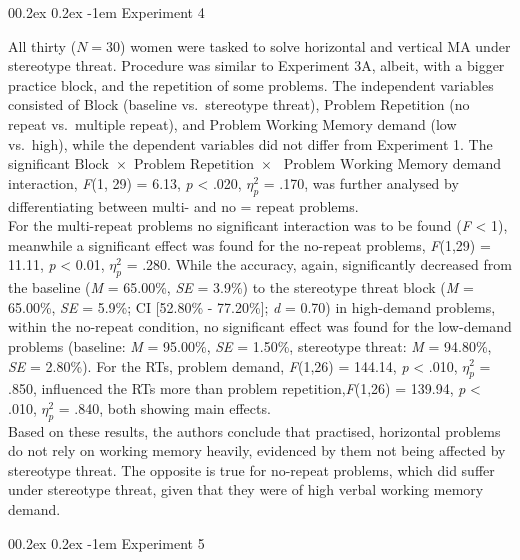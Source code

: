 \documentclass[
  stu,floatsintext]{apa7}
\makeatletter
\let\oldparagraph\paragraph
\renewcommand{\paragraph}[1]{\oldparagraph{#1}\mbox{}}
\renewcommand{\paragraph}{\@startsection{paragraph}{4}{\parindent}%
  {0\baselineskip \@plus 0.2ex \@minus 0.2ex}%
  {-1em}%
  {\normalfont\normalsize\bfseries\itshape\typesectitle}}
\renewcommand{\paragraph}{\@startsection{paragraph}{4}{\parindent}%
  {0\baselineskip \@plus 0.2ex \@minus 0.2ex}%
  {-1em}%
  {\normalfont\normalsize\bfseries\typesectitle}}
\makeatother
\begin{document}
\paragraph{Experiment 4}\label{experiment-4}

All thirty (\(N = 30\)) women were tasked to solve horizontal and vertical MA under stereotype threat.
Procedure was similar to Experiment 3A, albeit, with a bigger practice block, and the repetition of some problems.
The independent variables consisted of Block (baseline vs.~stereotype threat), Problem Repetition (no repeat vs.~multiple repeat), and Problem Working Memory demand (low vs.~high), while the dependent variables did not differ from Experiment 1.
The significant \(\text{Block } \times \text{ Problem Repetition } \times\) \(\text{ Problem Working Memory demand }\) interaction, \emph{F}(1, 29) = 6.13, \emph{p} \textless{} .020, \(\eta^{2}_{p}\) = .170, was further analysed by differentiating between multi- and no = repeat problems.\\
For the multi-repeat problems no significant interaction was to be found (\emph{F} \textless{} 1), meanwhile a significant effect was found for the no-repeat problems, \emph{F}(1,29) = 11.11, \emph{p} \textless{} 0.01, \(\eta^{2}_{p}\) = .280.
While the accuracy, again, significantly decreased from the baseline (\emph{M} = 65.00\%, \emph{SE} = 3.9\%) to the stereotype threat block (\emph{M} = 65.00\%, \emph{SE} = 5.9\%; CI {[}52.80\% - 77.20\%{]}; \emph{d} = 0.70) in high-demand problems, within the no-repeat condition, no significant effect was found for the low-demand problems (baseline: \emph{M} = 95.00\%, \emph{SE} = 1.50\%, stereotype threat: \emph{M} = 94.80\%, \emph{SE} = 2.80\%).
For the RTs, problem demand, \emph{F}(1,26) = 144.14, \emph{p} \textless{} .010, \(\eta^{2}_{p}\) = .850, influenced the RTs more than problem repetition,\emph{F}(1,26) = 139.94, \emph{p} \textless{} .010, \(\eta^{2}_{p}\) = .840, both showing main effects.\\
Based on these results, the authors conclude that practised, horizontal problems do not rely on working memory heavily, evidenced by them not being affected by stereotype threat.
The opposite is true for no-repeat problems, which did suffer under stereotype threat, given that they were of high verbal working memory demand.

\paragraph{Experiment 5}\label{experiment-5}
\end{document}
